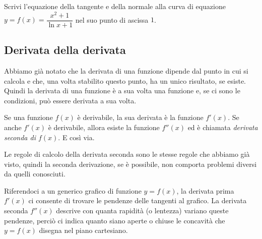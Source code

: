 \begin{esempio}
Scrivi l'equazione della tangente e della normale alla curva di equazione \\
\(y = f(x) = \dfrac{x^2+1}{\ln x +1}\) nel suo punto di ascissa \quad \(1\). 

\end{esempio}

\subsection{Derivata della derivata}
\label{subsec: differenziazione_derivata_seconda}
Abbiamo già notato che la derivata  di una funzione dipende dal punto in 
cui si 
calcola e che, una volta stabilito questo punto, ha un unico risultato,
se esiste.
Quindi la derivata di una funzione è a sua volta una funzione e,
se ci sono le condizioni, può essere derivata a sua volta.
\begin{definizione}
 Se una funzione \(f(x)\) è derivabile, la sua derivata è la funzione \(f'(x)\).
 Se anche \(f'(x)\) è derivabile, allora esiste la funzione \(f''(x)\) ed è
 chiamata \emph{derivata seconda di \(f(x)\)}. E così via.
\end{definizione}
Le regole di calcolo della derivata seconda sono le stesse regole che 
abbiamo già visto, quindi la seconda derivazione, se è possibile, non comporta 
problemi diversi da quelli conosciuti.

Riferendoci a un generico grafico di funzione \(y=f(x)\), la derivata prima 
\(f'(x)\) ci consente di trovare le pendenze delle tangenti al grafico. La
derivata seconda \(f''(x)\) descrive con quanta rapidità (o lentezza) variano 
queste pendenze, perciò ci indica quanto siano aperte o chiuse le concavità 
che \(y=f(x)\) disegna nel piano cartesiano.

